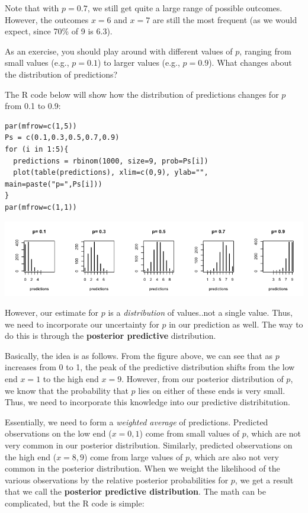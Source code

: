 \documentclass[11pt]{article}
\begin{document}
Note that with $p=0.7$, we still get quite a large range of possible outcomes.  However, the outcomes $x=6$ and $x=7$ are still the most frequent (as we would expect, since 70\% of 9 is 6.3).

As an exercise, you should play around with different values of $p$, ranging from small values (e.g., $p=0.1$) to larger values (e.g., $p=0.9$).  What changes about the distribution of predictions?  

The R code below will show how the distribution of predictions changes for $p$ from 0.1 to 0.9:

\begin{verbatim}
par(mfrow=c(1,5))
Ps = c(0.1,0.3,0.5,0.7,0.9)
for (i in 1:5){
  predictions = rbinom(1000, size=9, prob=Ps[i])
  plot(table(predictions), xlim=c(0,9), ylab="", main=paste("p=",Ps[i]))
}
par(mfrow=c(1,1))
\end{verbatim}

\includegraphics[width=.9\linewidth]{figures/week9/predictive.png}

However, our estimate for $p$ is a \emph{distribution} of values..not a single value.  Thus, we need to incorporate our uncertainty for $p$ in our prediction as well.  The way to do this is through the \textbf{posterior predictive} distribution. 

Basically, the idea is as follows.  From the figure above, we can see that as $p$ increases from 0 to 1, the peak of the predictive distribution shifts from the low end $x=1$ to the high end $x=9$.  However, from our posterior distribution of $p$, we know that the probability that $p$ lies on either of these ends is very small.  Thus, we need to incorporate this knowledge into our predictive distribitution.  

Essentially, we need to form a \emph{weighted average} of predictions.  Predicted observations on the low end ($x=0,1$) come from small values of $p$, which are not very common in our posterior distribution.  Similarly, predicted observations on the high end ($x=8,9$) come from large values of $p$, which are also not very common in the posterior distribution.  When we weight the likelihood of the various observations by the relative posterior probabilities for $p$, we get a result that we call the \textbf{posterior predictive distribution}.  The math can be complicated, but the R code is simple:
\end{document}
